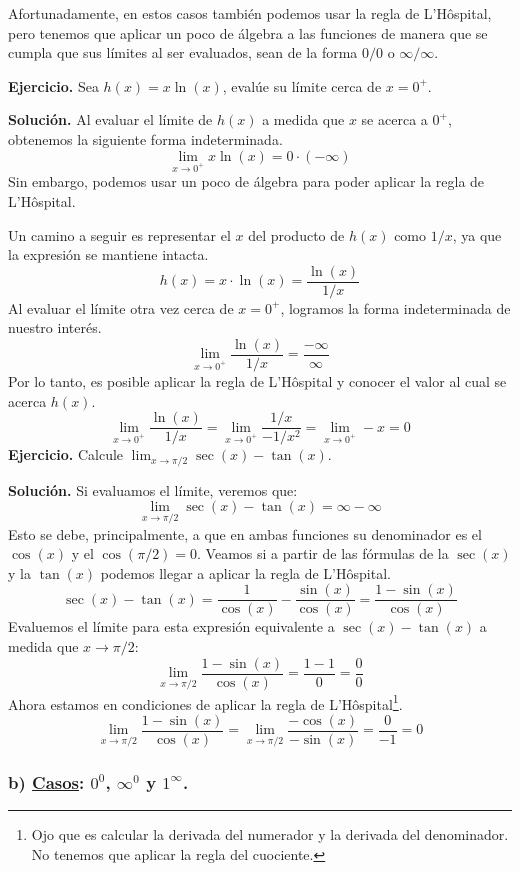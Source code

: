 \documentclass[12pt]{article}
\begin{document}
Afortunadamente, en estos casos también podemos usar la regla de L'Hôspital, pero tenemos que aplicar un poco de álgebra a las funciones de manera que se cumpla que sus límites al ser evaluados, sean de la forma $0/0$ o $\infty/\infty$.

\textbf{Ejercicio.} \quad Sea $h(x) = x\ln(x)$, evalúe su límite cerca de $x = 0^{+}$.

\textbf{Solución.} \quad Al evaluar el límite de $h(x)$ a medida que $x$ se acerca a $0^{+}$, obtenemos la siguiente forma indeterminada.
\[
\lim_{x \to 0^{+}} x \ln(x) = 0 \cdot (-\infty)
\]
Sin embargo, podemos usar un poco de álgebra para poder aplicar la regla de L'Hôspital.

Un camino a seguir es representar el $x$ del producto de $h(x)$ como $1/x$, ya que la expresión se mantiene intacta.
\[h(x) = x \cdot \ln(x) = \frac{\ln(x)}{1/x} \]
Al evaluar el límite otra vez cerca de $x = 0^{+}$, logramos la forma indeterminada de nuestro interés.
\[
	\lim_{x \to 0^{+}} \frac{\ln(x)}{1/x} = \frac{-\infty}{\infty}
\]
Por lo tanto, es posible aplicar la regla de L'Hôspital y conocer el valor al cual se acerca $h(x)$.
\[
	\lim_{x \to 0^{+}} \frac{\ln(x)}{1/x} =
	\lim_{x \to 0^{+}} \frac{1/x}{-1/x^{2}} =
	\lim_{x \to 0^{+}} -x = 0
\]
\textbf{Ejercicio.} \quad Calcule $\lim_{x \to \pi/2} \sec(x) - \tan(x)$.

\textbf{Solución.} \quad Si evaluamos el límite, veremos que:
\[
\lim_{x \to \pi/2} \sec(x) - \tan(x) = \infty - \infty
\]
Esto se debe, principalmente, a que en ambas funciones su denominador es el $\cos(x)$ y el $\cos(\pi/2) = 0$. Veamos si a partir de las fórmulas de la $\sec(x)$ y la $\tan(x)$ podemos llegar a aplicar la regla de L'Hôspital.
\[
\sec(x) - \tan(x) = \frac{1}{\cos(x)} - \frac{\sin(x)}{\cos(x)}
				  = \frac{1 - \sin(x)}{\cos(x)}
\]
Evaluemos el límite para esta expresión equivalente a $\sec(x) - \tan(x)$ a medida que $x \to \pi/2$:
\[
	\lim_{x \to \pi/2} \frac{1 - \sin(x)}{\cos(x)} = \frac{1 - 1}{0}
	 = \frac{0}{0}
\]
Ahora estamos en condiciones de aplicar la regla de L'Hôspital\footnote{Ojo que es calcular la derivada del numerador y la derivada del denominador. No tenemos que aplicar la regla del cuociente.}.
\[
	\lim_{x \to \pi/2} \frac{1 - \sin(x)}{\cos(x)} =
	\lim_{x \to \pi/2} \frac{-\cos(x)}{-\sin(x)} =
	\frac{0}{-1} = 0
\]

\subsubsection*{b) \underline{Casos}: $0^{0}$, $\infty^{0}$ y $1^{\infty}$.}
\end{document}
